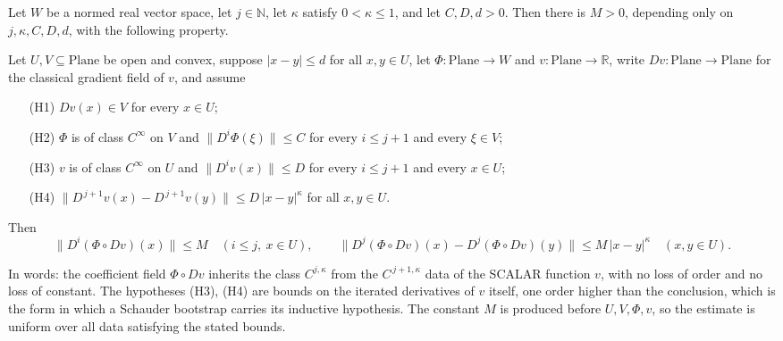 \begin{lemma}
Let $W$ be a normed real vector space, let $j\in\mathbb{N}$, let $\kappa$ satisfy
$0<\kappa\le1$, and let $C,D,d>0$.  Then there is $M>0$, depending only on
$j,\kappa,C,D,d$, with the following property.

Let $U,V\subseteq\mathrm{Plane}$ be open and convex, suppose $\lvert x-y\rvert\le d$ for all
$x,y\in U$, let $\Phi\colon\mathrm{Plane}\to W$ and $v\colon\mathrm{Plane}\to\mathbb{R}$, write
$Dv\colon\mathrm{Plane}\to\mathrm{Plane}$ for the classical gradient field of $v$, and assume
\begin{enumerate}
\item[(H1)] $Dv(x)\in V$ for every $x\in U$;
\item[(H2)] $\Phi$ is of class $C^{\infty}$ on $V$ and
  $\bigl\lVert D^{i}\Phi(\xi)\bigr\rVert\le C$ for every $i\le j+1$ and every $\xi\in V$;
\item[(H3)] $v$ is of class $C^{\infty}$ on $U$ and
  $\bigl\lVert D^{i}v(x)\bigr\rVert\le D$ for every $i\le j+1$ and every $x\in U$;
\item[(H4)] $\bigl\lVert D^{\,j+1}v(x)-D^{\,j+1}v(y)\bigr\rVert\le D\,\lvert x-y\rvert^{\kappa}$
  for all $x,y\in U$.
\end{enumerate}
Then
\[
  \bigl\lVert D^{i}(\Phi\circ Dv)(x)\bigr\rVert\le M
  \quad(i\le j,\ x\in U),
  \qquad
  \bigl\lVert D^{j}(\Phi\circ Dv)(x)-D^{j}(\Phi\circ Dv)(y)\bigr\rVert
    \le M\,\lvert x-y\rvert^{\kappa}
  \quad(x,y\in U).
\]

In words: the coefficient field $\Phi\circ Dv$ inherits the class $C^{j,\kappa}$ from the
$C^{\,j+1,\kappa}$ data of the SCALAR function $v$, with no loss of order and no loss of
constant.  The hypotheses (H3), (H4) are bounds on the iterated derivatives of $v$ itself, one
order higher than the conclusion, which is the form in which a Schauder bootstrap carries its
inductive hypothesis.  The constant $M$ is produced before $U,V,\Phi,v$, so the estimate is
uniform over all data satisfying the stated bounds.
\end{lemma}
